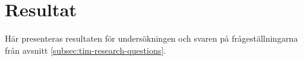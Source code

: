 \section{Resultat}
\label{sec:tim-results}
Här presenteras resultaten för undersökningen och svaren på frågeställningarna från avsnitt \ref{subsec:tim-research-questions}.
